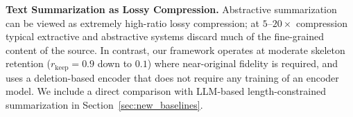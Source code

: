 \documentclass[11pt]{article}
\newcommand{\rkeep}{r_{\mathrm{keep}}}
\begin{document}
\textbf{Text Summarization as Lossy Compression.}
Abstractive summarization~\citep{rush2015neural,see2017get,liu2019text}
can be viewed as extremely high-ratio lossy compression; at
$5$--$20\times$ compression typical extractive and abstractive
systems discard much of the fine-grained content of the
source.  In contrast, our framework operates at moderate
skeleton retention ($\rkeep = 0.9$ down to $0.1$) 
where near-original
fidelity is required, and uses a deletion-based encoder that
does not require any training of an encoder model.
We include a direct comparison with LLM-based
length-constrained summarization in
Section~\ref{sec:new_baselines}.
\end{document}
